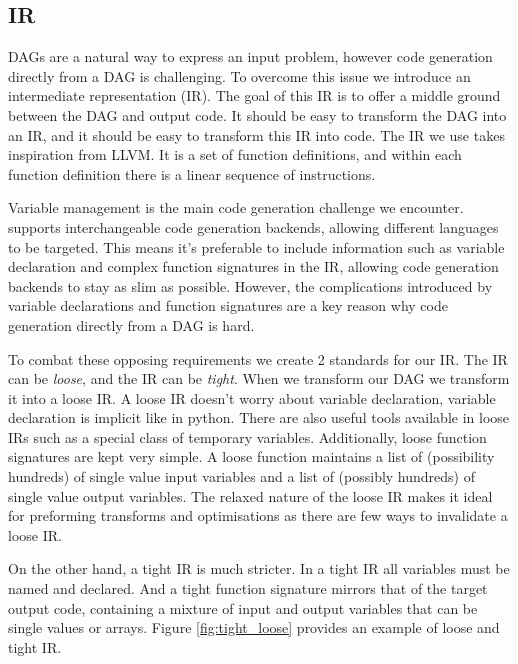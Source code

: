 \subsection{IR} \label{sec:IR}


DAGs are a natural way to express an input problem, however code generation directly from a DAG is challenging.
To overcome this issue we introduce an intermediate representation (IR).
The goal of this IR is to offer a middle ground between the DAG and output code.
It should be easy to transform the DAG into an IR, and it should be easy to transform this IR into code.
The IR we use takes inspiration from LLVM.
It is a set of function definitions, and within each function definition there is a linear sequence of instructions.

Variable management is the main code generation challenge we encounter.
\phlat supports interchangeable code generation backends, allowing different languages to be targeted.
This means it's preferable to include information such as variable declaration and complex function signatures in the IR, allowing code generation backends to stay as slim as possible.
However, the complications introduced by variable declarations and function signatures are a key reason why code generation directly from a DAG is hard.   


To combat these opposing requirements we create 2 standards for our IR.
The IR can be \textit{loose}, and the IR can be \textit{tight}.
When we transform our DAG we transform it into a loose IR.
A loose IR doesn't worry about variable declaration, variable declaration is implicit like in python.
There are also useful tools available in loose IRs such as a special class of temporary variables.
Additionally, loose function signatures are kept very simple.
A loose function maintains a list of (possibility hundreds) of single value input variables and a list of (possibly hundreds) of single value output variables.
The relaxed nature of the loose IR makes it ideal for preforming transforms and optimisations as there are few ways to invalidate a loose IR.

On the other hand, a tight IR is much stricter.
In a tight IR all variables must be named and declared.
And a tight function signature mirrors that of the target output code, containing a mixture of input and output variables that can be single values or arrays.
Figure \ref{fig:tight_loose} provides an example of loose and tight IR. 

